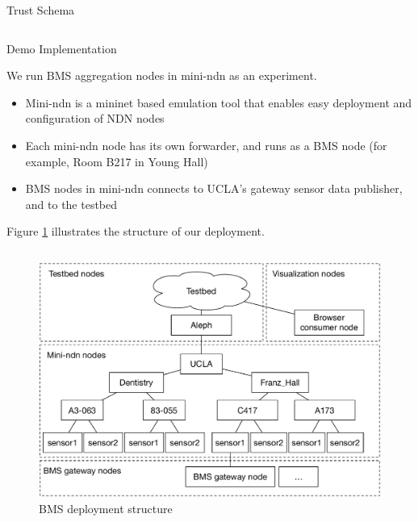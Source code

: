 \documentclass[final,hyperref={pdfpagelabels=false},20pt]{beamer}
\begin{document}
\begin{frame}[t]
\begin{columns}[t]
\begin{column}{.465\textwidth}
\begin{block}{Trust Schema}
\begin{columns}[T]
\end{columns}

\end{block}


\begin{block}{Demo Implementation}

We run BMS aggregation nodes in mini-ndn as an experiment.

\begin{itemize}
\item{Mini-ndn is a mininet based emulation tool that enables easy deployment and configuration of NDN nodes \cite{minindn-github}}
\item{Each mini-ndn node has its own forwarder, and runs as a BMS node (for example, Room B217 in Young Hall)}
\item{BMS nodes in mini-ndn connects to UCLA's gateway sensor data publisher, and to the testbed}
\end{itemize}

Figure \ref{fig:node-structure} illustrates the structure of our deployment.

\begin{columns}[T]

\begin{column}{.47\textwidth}
\begin{figure}
\includegraphics[width=\linewidth]{bms-nodes-structure}
\caption{BMS deployment structure}
\label{fig:node-structure}
\end{figure}
\end{column}


\end{columns}
\end{block}
\end{column}
\end{columns}
\end{frame}
\end{document}
